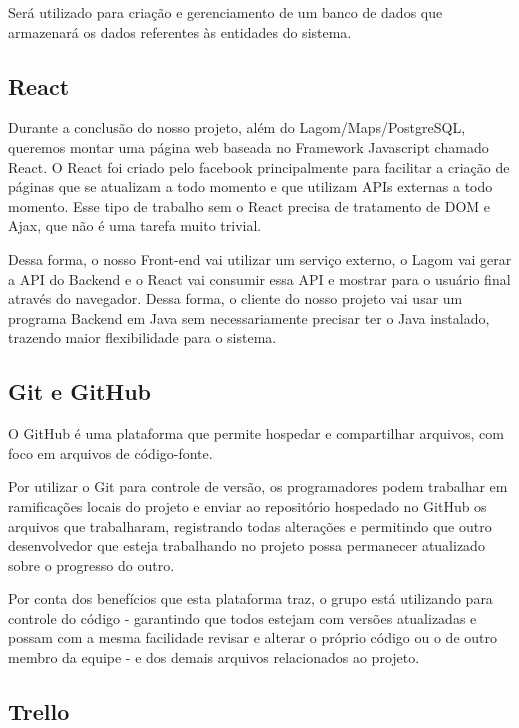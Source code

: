 \documentclass[a4paper,11pt,fleqn]{article}
\begin{document}
 Será utilizado para criação e gerenciamento de um banco de dados que armazenará os dados referentes às entidades do sistema.


\subsection{React}
\label{ss:react}

Durante a conclusão do nosso projeto, além do Lagom/Maps/PostgreSQL, queremos montar uma página web baseada no Framework Javascript chamado React.
  O React foi criado pelo facebook principalmente para facilitar a criação de páginas que se atualizam a todo momento e que utilizam APIs externas a todo momento. Esse
    tipo de trabalho sem o React precisa de tratamento de DOM e Ajax, que não é uma tarefa muito trivial.

Dessa forma, o nosso Front-end vai utilizar um serviço externo, o Lagom vai gerar a API do Backend e o React vai consumir essa API e mostrar para o usuário final
  através do navegador. Dessa forma, o cliente do nosso projeto vai usar um programa Backend em Java sem necessariamente precisar ter o Java instalado, trazendo
    maior flexibilidade para o sistema.



\subsection{Git e GitHub}
\label{ss:github}

O GitHub é uma plataforma que permite hospedar e compartilhar arquivos, com foco em arquivos de código-fonte.

Por utilizar o Git para controle de versão, os programadores podem trabalhar em ramificações locais do projeto e enviar ao repositório hospedado no GitHub os arquivos
 que trabalharam, registrando todas alterações e permitindo que outro desenvolvedor que esteja trabalhando no projeto possa permanecer atualizado sobre o progresso
  do outro.

Por conta dos benefícios que esta plataforma traz, o grupo está utilizando para controle do código - garantindo que todos estejam com versões atualizadas
 e possam com a mesma facilidade revisar e alterar o próprio código ou o de outro membro da equipe - e dos demais arquivos relacionados ao projeto. 

\subsection{Trello}
\label{ss:trello}
\end{document}

